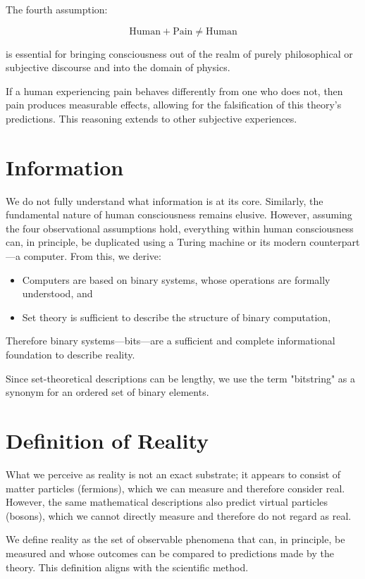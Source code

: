 \documentclass[11pt]{article}
\begin{document}
The fourth assumption:

\[
      \text{Human} + \text{Pain} \neq \text{Human}
\]

is essential for bringing consciousness out of the realm of purely philosophical or subjective discourse and into the domain of physics.

If a human experiencing pain behaves differently from one who does not, then pain produces measurable effects, allowing for the falsification of this theory's predictions. This reasoning extends to other subjective experiences.


\section{Information}

We do not fully understand what information is at its core. Similarly, the fundamental nature of human consciousness remains elusive.  However, assuming the four observational assumptions hold, everything within human consciousness can, in principle, be duplicated using a Turing machine or its modern counterpart—a computer. From this, we derive:

\begin{itemize}
      \item Computers are based on binary systems, whose operations are formally understood, and
      \item Set theory is sufficient to describe the structure of binary computation,
\end{itemize}

Therefore binary systems—bits—are a sufficient and complete informational foundation to describe reality.

Since set-theoretical descriptions can be lengthy, we use the term "bitstring" as a synonym for an ordered set of binary elements.


\section{Definition of Reality}

What we perceive as reality is not an exact substrate; it appears to consist of matter particles (fermions), which we can measure and therefore consider real. However, the same mathematical descriptions also predict virtual particles (bosons), which we cannot directly measure and therefore do not regard as real.

We define reality as the set of observable phenomena that can, in principle, be measured and whose outcomes can be compared to predictions made by the theory. This definition aligns with the scientific method.
\end{document}
